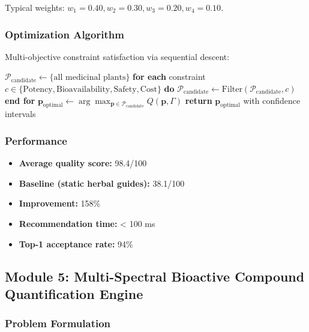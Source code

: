 \documentclass[11pt,a4paper]{article}
\begin{document}
Typical weights: $w_1=0.40, w_2=0.30, w_3=0.20, w_4=0.10$.

\subsubsection{Optimization Algorithm}

Multi-objective constraint satisfaction via sequential descent:

\begin{algorithm}
\caption{Reverse Botanical Recommendation}
\begin{algorithmic}[1]
\State $\mathcal{P}_{\text{candidate}} \gets \{\text{all medicinal plants}\}$
\State \textbf{for each} constraint $c \in \{\text{Potency}, \text{Bioavailability}, \text{Safety}, \text{Cost}\}$ \textbf{do}
\State \quad $\mathcal{P}_{\text{candidate}} \gets \text{Filter}(\mathcal{P}_{\text{candidate}}, c)$
\State \textbf{end for}
\State $\mathbf{p}_{\text{optimal}} \gets \arg\max_{\mathbf{p} \in \mathcal{P}_{\text{candidate}}} Q(\mathbf{p}, \Gamma)$
\State \textbf{return} $\mathbf{p}_{\text{optimal}}$ with confidence intervals
\end{algorithmic}
\end{algorithm}

\subsubsection{Performance}

\begin{itemize}
    \item \textbf{Average quality score:} 98.4/100
    \item \textbf{Baseline (static herbal guides):} 38.1/100
    \item \textbf{Improvement:} 158\%
    \item \textbf{Recommendation time:} < 100 ms
    \item \textbf{Top-1 acceptance rate:} 94\%
\end{itemize}

\subsection{Module 5: Multi-Spectral Bioactive Compound Quantification Engine}

\subsubsection{Problem Formulation}
\end{document}
